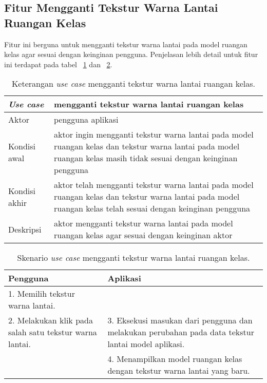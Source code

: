 \subsection{Fitur Mengganti Tekstur Warna Lantai Ruangan Kelas}
Fitur ini berguna untuk mengganti tekstur warna lantai pada model ruangan kelas agar sesuai dengan keinginan pengguna. Penjelasan lebih detail untuk fitur ini terdapat pada tabel ~\ref{table:fiturgantiteksturlantai1} dan ~\ref{table:fiturgantiteksturlantai2}.
\begin{table}[H]
	\centering
	\begin{tabular}{| m{10em} | m{30em} |} 
	\hline
	\textbf{\textit{Use case}} & \textbf{mengganti tekstur warna lantai ruangan kelas} \\ 
	\hline
	Aktor & pengguna aplikasi  \\ 
	\hline
	Kondisi awal & aktor ingin mengganti tekstur warna lantai pada model ruangan kelas dan tekstur warna lantai pada model ruangan kelas masih tidak sesuai dengan keinginan pengguna \\ 
	\hline
	Kondisi akhir & aktor telah mengganti tekstur warna lantai pada model ruangan kelas dan tekstur warna lantai pada model ruangan kelas telah sesuai dengan keinginan pengguna \\ 
 	\hline
	Deskripsi & aktor mengganti tekstur warna lantai pada model ruangan kelas agar sesuai dengan keinginan aktor \\ 
 	\hline
	\end{tabular}
	\caption{Keterangan {\it use case} mengganti tekstur warna lantai ruangan kelas.}
	\label{table:fiturgantiteksturlantai1}
\end{table}

\begin{table}[H]
	\centering
	\begin{tabular}{| m{20em} | m{20em} |} 
	\hline
	\textbf{Pengguna} & \textbf{Aplikasi} \\ 
	\hline
	1. Memilih tekstur warna lantai. &  \\ 
	\hline
	2. Melakukan klik pada salah satu tekstur warna lantai. & 3. Eksekusi masukan dari pengguna dan melakukan perubahan pada data tekstur lantai model aplikasi. \\ 
	\hline
	 & 4. Menampilkan model ruangan kelas dengan tekstur warna lantai yang baru. \\ 
 	\hline
	\end{tabular}
	\caption{Skenario {\it use case} mengganti tekstur warna lantai ruangan kelas.}
	\label{table:fiturgantiteksturlantai2}
\end{table}

